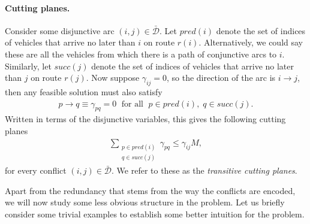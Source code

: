\documentclass[a4paper]{report}
\theoremstyle{definition}
\theoremstyle{plain}
\begin{document}
\paragraph{Cutting planes.}
Consider some disjunctive arc $(i,j) \in \bar{\mathcal{D}}$. Let
$\mathit{pred}(i)$ denote the set of indices of vehicles that arrive no later
than $i$ on route $r(i)$. Alternatively, we could say
these are all the vehicles from which there is a path of conjunctive arcs to
$i$. Similarly, let $\mathit{succ}(j)$ denote the set of indices of vehicles
that arrive no later than $j$ on route $r(j)$.
%
Now suppose $\gamma_{ij} = 0$, so the direction of the arc is $i \rightarrow j$,
then any feasible solution must also satisfy
\begin{align*}
  p \rightarrow q \equiv \gamma_{pq} = 0 \; \text{ for all } \; p \in \mathit{pred}(i), \; q \in \mathit{succ}(j) .
\end{align*}
Written in terms of the disjunctive variables, this gives the following cutting
planes
\begin{align*}
  \sum_{\substack{p \in \mathit{pred}(i)\\ q \in \mathit{succ}(j)}} \gamma_{pq} \leq \gamma_{ij} M ,
\end{align*}
for every conflict $(i,j) \in \bar{\mathcal{D}}$. We refer to these as
the \textit{transitive cutting planes}.


Apart from the redundancy that stems from the way the conflicts are encoded, we
will now study some less obvious structure in the problem.
%
Let us briefly consider some trivial examples to establish some better intuition
for the problem.
\end{document}
